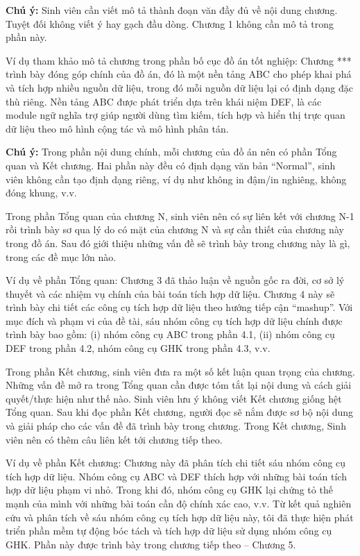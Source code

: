 \documentclass[../main.tex]{subfiles}
\begin{document}
\textbf{Chú ý:} Sinh viên cần viết mô tả thành đoạn văn đầy đủ về nội dung chương. Tuyệt đối không viết ý hay gạch đầu dòng. Chương 1 không cần mô tả trong phần này. 

Ví dụ tham khảo mô tả chương trong phần bố cục đồ án tốt nghiệp: Chương *** trình bày đóng góp chính của đồ án, đó là một nền tảng ABC cho phép khai phá và tích hợp nhiều nguồn dữ liệu, trong đó mỗi nguồn dữ liệu lại có định dạng đặc thù riêng. Nền tảng ABC được phát triển dựa trên khái niệm DEF, là các module ngữ nghĩa trợ giúp người dùng tìm kiếm, tích hợp và hiển thị trực quan dữ liệu theo mô hình cộng tác và mô hình phân tán.

\textbf{Chú ý:} Trong phần nội dung chính, mỗi chương của đồ án nên có phần Tổng quan và Kết chương. Hai phần này đều có định dạng văn bản “Normal”, sinh viên không cần tạo định dạng riêng, ví dụ như không in đậm/in nghiêng, không đóng khung, v.v. 

Trong phần Tổng quan của chương N, sinh viên nên có sự liên kết với chương N-1 rồi trình bày sơ qua lý do có mặt của chương N và sự cần thiết của chương này trong đồ án. Sau đó giới thiệu những vấn đề sẽ trình bày trong chương này là gì, trong các đề mục lớn nào.

Ví dụ về phần Tổng quan: Chương 3 đã thảo luận về nguồn gốc ra đời, cơ sở lý thuyết và các nhiệm vụ chính của bài toán tích hợp dữ liệu. Chương 4 này sẽ trình bày chi tiết các công cụ tích hợp dữ liệu theo hướng tiếp cận “mashup”. Với mục đích và phạm vi của đề tài, sáu nhóm công cụ tích hợp dữ liệu chính được trình bày bao gồm: (i) nhóm công cụ ABC trong phần 4.1, (ii) nhóm công cụ DEF trong phần 4.2, nhóm công cụ GHK trong phần 4.3, v.v.

Trong phần Kết chương, sinh viên đưa ra một số kết luận quan trọng của chương. Những vấn đề mở ra trong Tổng quan cần được tóm tắt lại nội dung và cách giải quyết/thực hiện như thế nào. Sinh viên lưu ý không viết Kết chương giống hệt Tổng quan. Sau khi đọc phần Kết chương, người đọc sẽ nắm được sơ bộ nội dung và giải pháp cho các vấn đề đã trình bày trong chương. Trong Kết chương, Sinh viên nên có thêm câu liên kết tới chương tiếp theo.

Ví dụ về phần Kết chương: Chương này đã phân tích chi tiết sáu nhóm công cụ tích hợp dữ liệu. Nhóm công cụ ABC và DEF thích hợp với những bài toán tích hợp dữ liệu phạm vi nhỏ. Trong khi đó, nhóm công cụ GHK lại chứng tỏ thế mạnh của mình với những bài toán cần độ chính xác cao, v.v. Từ kết quả nghiên cứu và phân tích về sáu nhóm công cụ tích hợp dữ liệu này, tôi đã thực hiện phát triển phần mềm tự động bóc tách và tích hợp dữ liệu sử dụng nhóm công cụ GHK. Phần này được trình bày trong chương tiếp theo – Chương 5.
\end{document}

